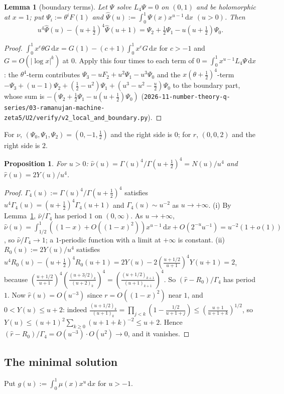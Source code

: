 \documentclass[11pt]{amsart}
\newtheorem{proposition}[theorem]{Proposition}
\newtheorem{lemma}[theorem]{Lemma}
\theoremstyle{definition}
\theoremstyle{remark}
\numberwithin{equation}{section}
\newcommand{\dd}{\,\mathrm{d}}
\newcommand{\file}[1]{\nolinkurl{2026-11-number-theory-q-series/03-ramanujan-machine-zeta5/#1}}
\begin{document}
\begin{lemma}[boundary terms]\label{lem:bdry}
Let $\Psi$ solve $L_4\Psi=0$ on $(0,1)$ and be holomorphic at $x=1$; put $\Psi_i:=\theta^iF(1)$ and $\hat \Psi(u):=\int_0^1\Psi(x)x^{u-1}\dd x$ $(u>0)$. Then
\[
u^4\hat \Psi(u)-(u+\tfrac12)^4\hat \Psi(u+1)=\Psi_2+\tfrac12\Psi_1-u(u+\tfrac12)\Psi_0.
\]
\end{lemma}
\begin{proof}
$\int_0^1x^c\theta G\dd x=G(1)-(c+1)\int_0^1x^cG\dd x$ for $c>-1$ and $G=O(|\log x|^k)$ at $0$. Apply this four times to each term of $0=\int_0^1x^{u-1}L_4\Psi\dd x$: the $\theta^4$-term contributes $\Psi_3-uF_2+u^2\Psi_1-u^3\Psi_0$ and the $x(\theta+\frac12)^4$-term $-\Psi_3+(u-1)\Psi_2+(\frac12-u^2)\Psi_1+(u^3-u^2-\frac u2)\Psi_0$ to the boundary part, whose sum is $-(\Psi_2+\frac12\Psi_1-u(u+\frac12)\Psi_0)$ (\file{U2/verify/v2_local_and_boundary.py}).
\end{proof}

For $\nu$, $(\Psi_0,\Psi_1,\Psi_2)=(0,-1,\frac12)$ and the right side is $0$; for $r$, $(0,0,2)$ and the right side is $2$.

\begin{proposition}\label{prop:mellinnu}
For $u>0$: $\hat\nu(u)=\Gamma(u)^4/\Gamma(u+\frac12)^4=N(u)/u^4$ and $\hat r(u)=2Y(u)/u^4$.
\end{proposition}
\begin{proof}
$\Gamma_4(u):=\Gamma(u)^4/\Gamma(u+\frac12)^4$ satisfies $u^4\Gamma_4(u)=(u+\frac12)^4\Gamma_4(u+1)$ and $\Gamma_4(u)\sim u^{-2}$ as $u\to+\infty$.
(i) By Lemma~\ref{lem:bdry}, $\hat\nu/\Gamma_4$ has period $1$ on $(0,\infty)$. As $u\to+\infty$, $\hat\nu(u)=\int_{1/2}^1((1-x)+O((1-x)^2))x^{u-1}\dd x+O(2^{-u}u^{-1})=u^{-2}(1+o(1))$, so $\hat\nu/\Gamma_4\to1$; a $1$-periodic function with a limit at $+\infty$ is constant.
(ii) $R_0(u):=2Y(u)/u^4$ satisfies $u^4R_0(u)-(u+\frac12)^4R_0(u+1)=2Y(u)-2(\frac{u+1/2}{u+1})^4Y(u+1)=2$, because $(\frac{u+1/2}{u+1})^4(\frac{(u+3/2)_k}{(u+2)_k})^4=(\frac{(u+1/2)_{k+1}}{(u+1)_{k+1}})^4$. So $(\hat r-R_0)/\Gamma_4$ has period $1$. Now $\hat r(u)=O(u^{-3})$ since $r=O((1-x)^2)$ near $1$, and $0<Y(u)\le u+2$: indeed $\frac{(u+1/2)_k}{(u+1)_k}=\prod_{j<k}(1-\frac{1/2}{u+1+j})\le(\frac{u+1}{u+1+k})^{1/2}$, so $Y(u)\le(u+1)^2\sum_{k\ge0}(u+1+k)^{-2}\le u+2$. Hence $(\hat r-R_0)/\Gamma_4=O(u^{-3})\cdot O(u^2)\to0$, and it vanishes.
\end{proof}

\subsection{The minimal solution}
Put $g(u):=\int_0^1\mu(x)x^u\dd x$ for $u>-1$.
\end{document}
